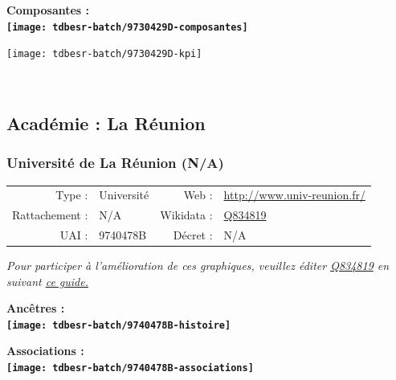 \documentclass[12pt,french,]{article}
\begin{document}
\hrulefill

\begin{center} \bf Composantes : \\  
\texttt{[image: tdbesr-batch/9730429D-composantes]} \end{center}

\begin{center}\texttt{[image: tdbesr-batch/9730429D-kpi]} \end{center}\checkoddpage

\ifoddpage \fi ~\newpage  

\hypertarget{acaduxe9mie-la-ruxe9union}{%
\subsection{Académie : La Réunion}\label{acaduxe9mie-la-ruxe9union}}

\hypertarget{universituxe9-de-la-ruxe9union-na}{%
\subsubsection{Université de La Réunion
(N/A)}\label{universituxe9-de-la-ruxe9union-na}}

\begin{tabular*}{\textwidth}{rp{5cm}rl}  
\hline  
Type : & Université & Web : &\href{http://www.univ-reunion.fr/}{http://www.univ-reunion.fr/} \\  
Rattachement : & N/A & Wikidata : & \href{https://www.wikidata.org/entity/Q834819}{Q834819} \\  
UAI : & 9740478B & Décret : & N/A \\  
\hline  
\end{tabular*}

\textit{\scriptsize Pour participer à l'amélioration de ces graphiques, veuillez éditer  \href{https://www.wikidata.org/entity/Q834819}{Q834819}  en suivant \href{https://github.com/cpesr/wikidataESR/blob/master/Rmd/wikidataESR.md}{ce guide.}}

\vspace{1cm}  
\begin{minipage}[b]{0.50\textwidth}\begin{center} \bf Ancêtres : \\  
\texttt{[image: tdbesr-batch/9740478B-histoire]} \end{center}\end{minipage}\begin{minipage}[b]{0.50\textwidth}\begin{center} \bf Associations : \\  
\texttt{[image: tdbesr-batch/9740478B-associations]} \end{center}\end{minipage}
\end{document}
